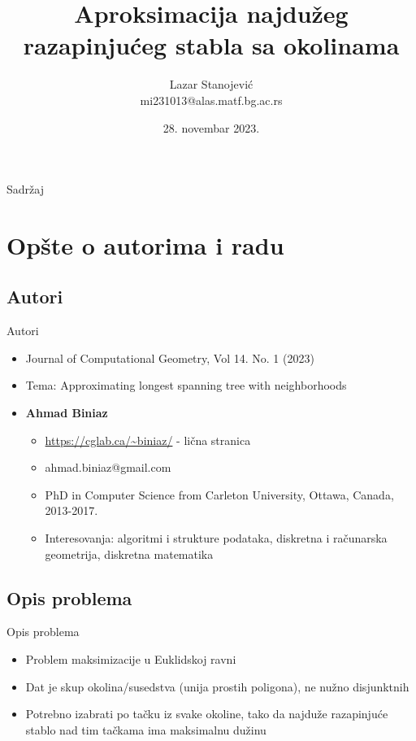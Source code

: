 \documentclass[hyperref={bookmarks=false}]{beamer}
\title{Aproksimacija najdužeg razapinjućeg stabla sa okolinama}
\author[Lazar Stanojević]{Lazar Stanojević\\\small mi231013@alas.matf.bg.ac.rs}
\institute[]{Geometrijski algoritmi\\Matematički fakultet, Univerzitet u Beogradu}
\date[Matematički fakultet]{28. novembar 2023.}
\begin{document}
\frame{\titlepage}

\begin{frame}{Sadržaj}
\tableofcontents[subsectionstyle=show]
\end{frame}

\section{Opšte o autorima i radu}
\subsection{Autori}
\begin{frame}{Autori}
\begin{itemize}
\item Journal of Computational Geometry, Vol 14. No. 1 (2023)
\item Tema: Approximating longest spanning tree with neighborhoods
\item \textbf{Ahmad Biniaz}
\begin{itemize}
    \item \url{https://cglab.ca/~biniaz/} - lična stranica
    \item ahmad.biniaz@gmail.com
    \item PhD in Computer Science from Carleton University, Ottawa, Canada, 2013-2017.
    \item Interesovanja: algoritmi i strukture podataka, diskretna i računarska geometrija, diskretna matematika
\end{itemize}
\end{itemize}
\end{frame}

\subsection{Opis problema}
\begin{frame}{Opis problema}
\begin{itemize}
    \item Problem maksimizacije u Euklidskoj ravni
    \item Dat je skup okolina/susedstva (unija prostih poligona), ne nužno disjunktnih
    \item Potrebno izabrati po tačku iz svake okoline, tako da najduže razapinjuće stablo nad tim tačkama ima maksimalnu dužinu
\end{itemize}
\end{frame}
\end{document}
